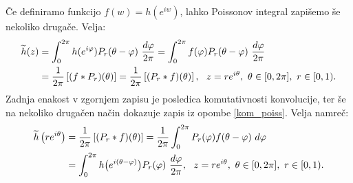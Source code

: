 \documentclass[mat1]{fmfdelo}
\begin{document}
     \begin{opomba}
        \label{opomba_konv1}
        Če definiramo funkcijo $f(w) = h(e^{iw})$, lahko Poissonov integral zapišemo še nekoliko drugače. Velja:
        \begin{align}
            \label{konv_Pr}
            \widetilde{h}(z) &= \int_{0}^{2\pi}{h(e^{i\varphi}) P_r(\theta - \varphi)~\frac{d\varphi}{2 \pi}} = \int_{0}^{2\pi}{f(\varphi) P_r(\theta - \varphi)~\frac{d\varphi}{2 \pi}} \notag \\
            & = \frac{1}{2\pi} \left[(f * P_r)(\theta)\right] = \frac{1}{2\pi} \left[(P_r * f)(\theta)\right],~~z = r e^{i\theta},~\theta \in [0,2\pi],~r\in[0,1).
        \end{align}
        Zadnja enakost v zgornjem zapisu je posledica komutativnosti konvolucije, ter še na nekoliko drugačen način dokazuje zapis iz opombe \ref{kom_poiss}. Velja namreč:
        \begin{align*}
            \widetilde{h}\left(r e^{i \theta}\right) &= \frac{1}{2\pi} \left[(P_r * f)(\theta)\right] =  \frac{1}{2 \pi}\int_{0}^{2\pi}{P_r(\varphi) f(\theta - \varphi) ~d\varphi} \\
            & = \int_{0}^{2\pi}{h\big(e^{i(\theta-\varphi)}\big) P_r(\varphi)~\frac{d\varphi}{2 \pi}},~~z = r e^{i\theta},~\theta \in [0,2\pi],~r\in[0,1). \notag
        \end{align*}
     \end{opomba}
\end{document}
